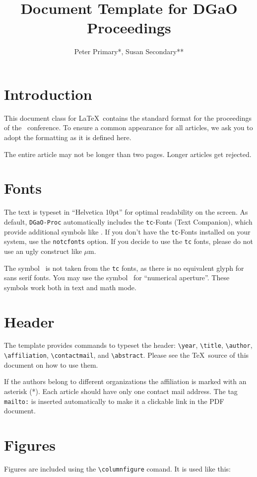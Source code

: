 \documentclass{DGaO-Proc}
\title{Document Template for DGaO Proceedings}
\author{Peter Primary*, Susan Secondary{**}}
\affiliation{*Institute for This and That, University of Somewhere\\{**}Secondary Ltd., Anytown}
\begin{document}
\section{Introduction}

This document class for \LaTeX\ contains the standard format for the 
proceedings of the \dgao\ conference. To ensure a common appearance for all articles, 
we ask you to adopt the formatting as it is defined here.

The entire article may not be longer than two pages. Longer articles get rejected.

\section{Fonts}

The text is typeset in ``Helvetica 10pt'' for optimal readability on the screen. 
As default, {\tt DGaO-Proc} automatically includes the {\tt tc}-Fonts (Text Companion), 
which provide additional symbols like \um. If you don't have the
{\tt tc}-Fonts installed on your system, use the {\tt notcfonts} option. If you decide
to use the {\tt tc} fonts, please do not use an ugly construct like $\mu$m.

The symbol \permil\ is not taken from the {\tt tc} fonts, as there is no equivalent glyph
for sans serif fonts. You may use the symbol \na\ for ``numerical aperture''. These symbols
work both in text and math mode.

\section{Header}

The template provides commands to typeset the header: \verb|\year|, \verb|\title|, \verb|\author|,
\verb|\affiliation|, \verb|\contactmail|, and \verb|\abstract|. Please see the \TeX\ source of this 
document on how to use them. 

If the authors belong to different organizations 
the affiliation is marked with an asterisk (*). Each article should have only one contact mail address.
The tag {\tt mailto:} is inserted automatically to make it a clickable link in the PDF document.

\section{Figures}

Figures are included using the
\verb|\columnfigure| comand. It is used like this:
\end{document}
